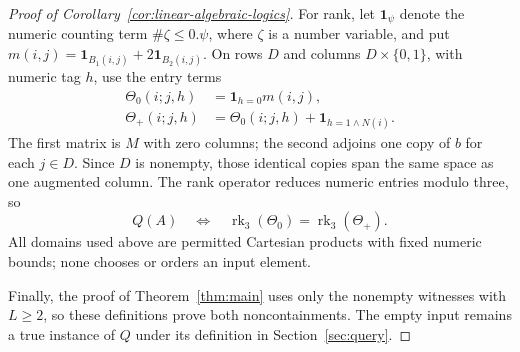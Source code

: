 \begin{proof}[Proof of Corollary~\ref{cor:linear-algebraic-logics}]
For rank, let $\mathbf{1}_\psi$ denote the numeric counting term
$\#\zeta\leq0.\psi$, where $\zeta$ is a number variable, and put
$m(i,j)=\mathbf{1}_{B_1(i,j)}+2\mathbf{1}_{B_2(i,j)}$.
On rows $D$ and columns $D\times\{0,1\}$, with numeric tag $h$, use the
entry terms
\[
\begin{aligned}
 \Theta_0(i;j,h)&=\mathbf{1}_{h=0}m(i,j),\\
 \Theta_+(i;j,h)&=\Theta_0(i;j,h)+\mathbf{1}_{h=1\wedge N(i)}.
\end{aligned}
\]
The first matrix is $M$ with zero columns; the second adjoins one copy
of $b$ for each $j\in D$. Since $D$ is nonempty, those identical copies
span the same space as one augmented column. The rank operator reduces
numeric entries modulo three, so
\[
 Q(A)\quad\Longleftrightarrow\quad
 \operatorname{rk}_3(\Theta_0)=\operatorname{rk}_3(\Theta_+).
\]
All domains used above are permitted Cartesian products with fixed
numeric bounds; none chooses or orders an input element.

Finally, the proof of Theorem~\ref{thm:main} uses only the nonempty
witnesses with $L\geq2$, so these definitions prove both noncontainments.
The empty input remains a true instance of $Q$ under its definition in
Section~\ref{sec:query}.
\end{proof}

